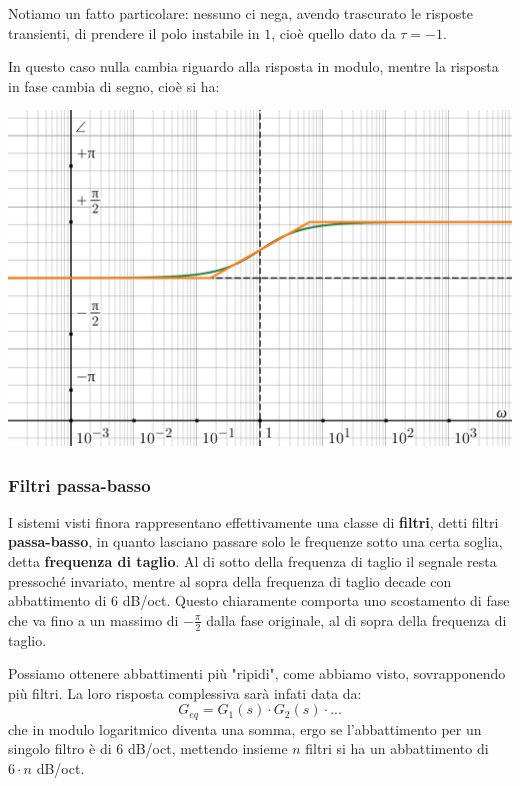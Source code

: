 \documentclass[a4paper,11pt]{article}
\begin{document}
\par\medskip

Notiamo un fatto particolare: nessuno ci nega, avendo trascurato le risposte transienti, di prendere il polo instabile in $1$, cioè quello dato da $\tau = -1$.

\par\medskip

\noindent
\begin{minipage}{\textwidth}
In questo caso nulla cambia riguardo alla risposta in modulo, mentre la risposta in fase cambia di segno, cioè si ha:
\begin{center}
	\includegraphics[scale=0.3]{../figures/lowpass_bode/phase_weird.png}
\end{center}
\end{minipage}

\par\medskip

\subsubsection{Filtri passa-basso}
I sistemi visti finora rappresentano effettivamente una classe di \textbf{filtri}, detti filtri \textbf{passa-basso}, in quanto lasciano passare solo le frequenze sotto una certa soglia, detta \textbf{frequenza di taglio}.
Al di sotto della frequenza di taglio il segnale resta pressoché invariato, mentre al sopra della frequenza di taglio decade con abbattimento di 6 dB/oct.
Questo chiaramente comporta uno scostamento di fase che va fino a un massimo di $-\frac{\pi}{2}$ dalla fase originale, al di sopra della frequenza di taglio.

Possiamo ottenere abbattimenti più "ripidi", come abbiamo visto, sovrapponendo più filtri.
La loro risposta complessiva sarà infati data da:
$$
G_{eq} = G_1(s) \cdot G_2(s) \cdot ...
$$
che in modulo logaritmico diventa una somma, ergo se l'abbattimento per un singolo filtro è di 6 dB/oct, mettendo insieme $n$ filtri si ha un abbattimento di $6 \cdot n$ dB/oct.
\end{document}
